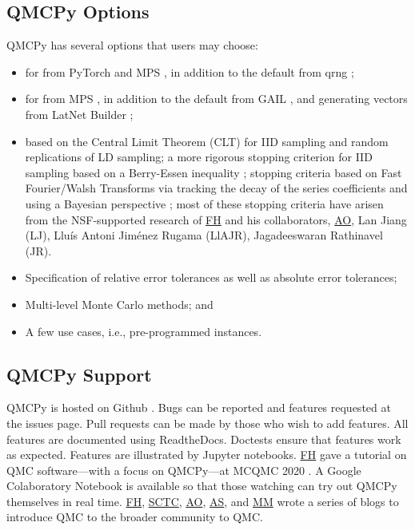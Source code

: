 \documentclass[11pt]{NSFamsart}
\newcommand{\FH}{\hyperlink{FHlink}{FH}\xspace}
\newcommand{\SCTC}{\hyperlink{SCTClink}{SCTC}\xspace}
\newcommand{\AO}{\hyperlink{AOlink}{AO}\xspace}
\newcommand{\MM}{\hyperlink{MMlink}{MM}\xspace}
\newcommand{\AS}{\hyperlink{ASlink}{AS}\xspace}
\begin{document}
 \subsection{QMCPy Options}
 QMCPy has several options that users may choose:
 \begin{itemize}
 	\item {} for  from PyTorch \cite{PyTorch} and MPS \cite{Nuy17a}, in addition to the default from qrng \cite{QRNG2020};
 	
 	\item {} for  from MPS \cite{Nuy17a}, in addition to the default from GAIL \cite{ChoEtal20a}, and generating vectors from LatNet Builder \cite{LatNet};
 	
 	\item {} based on the Central Limit Theorem (CLT) for IID sampling and random replications of LD sampling;  a more rigorous stopping criterion for IID sampling based on a Berry-Essen inequality \cite{HicEtal14a};  stopping criteria based on Fast Fourier/Walsh Transforms via tracking the decay of the series coefficients \cite{HicJim16a, JimHic16a} and using a Bayesian perspective \cite{RatHic19a}; most of these stopping criteria have arisen from the NSF-supported research of \FH and his collaborators, \AO, \hypertarget{LJlink}{Lan Jiang} (LJ), 
 	\hypertarget{LlAJRlink}{Llu\'is Antoni Jim\'enez Rugama} (LlAJR), \hypertarget{JRlink}{Jagadeeswaran Rathinavel} (JR).
 	
 	\item Specification of relative error tolerances as well as absolute error tolerances;
 	
 	\item Multi-level Monte Carlo methods; and 
 	
 	\item A few use cases, i.e., pre-programmed  instances.
 \end{itemize}
 
\subsection{QMCPy Support}
QMCPy is hosted on Github \cite{QMCPy2020a}. Bugs can be reported and features requested at the issues page.  Pull requests can be made by those who wish to add features.  All features are documented \cite{QMCPyDocs} using ReadtheDocs.  Doctests ensure that features work as expected. Features are illustrated by Jupyter notebooks.  \FH gave a tutorial on QMC software---with a focus on QMCPy---at MCQMC 2020 \cite{MCQMC2020QMCPyTut}.  A Google Colaboratory Notebook \cite{QMCPyTutColab2020} is available so that those watching  can try out QMCPy themselves in real time.  \FH, \SCTC, \AO, \AS, and \MM wrote a series of blogs \cite{QMCBlog} to introduce QMC to the broader community to QMC.
\end{document}
